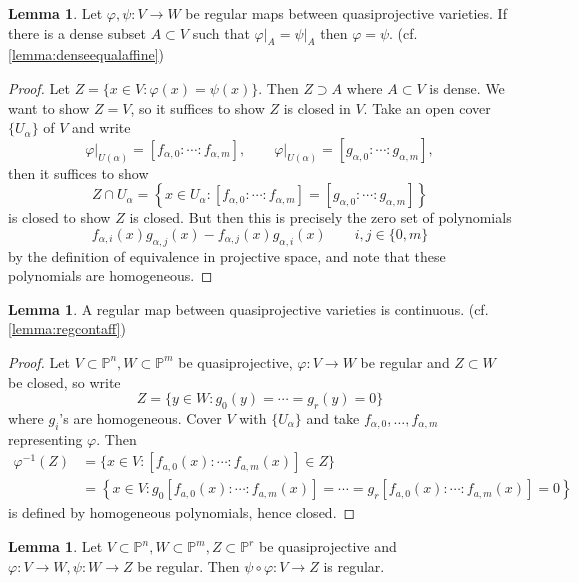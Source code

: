 \documentclass{article}
\newcommand{\p}{\mathbb{P}}
\theoremstyle{definition}
\newtheorem{lemma}[defn]{Lemma}
\begin{document}
\begin{lemma}
Let $\varphi,\psi:V\rightarrow W$ be regular maps between quasiprojective varieties. If there is a dense subset $A\subset V$ such that $\left.\varphi\right|_A=\left.\psi\right|_A$ then $\varphi=\psi$. (cf. \ref{lemma:denseequalaffine})
\end{lemma}
\begin{proof}
Let $Z=\{x\in V:\varphi(x)=\psi(x)\}$. Then $Z\supset A$ where $A\subset V$ is dense. We want to show $Z=V$, so it suffices to show $Z$ is closed in $V$. Take an open cover $\{U_\alpha\}$ of $V$ and write
\[
\left.\varphi\right|_{U(\alpha)}=\left[f_{\alpha,0}:\cdots:f_{\alpha,m}\right],\qquad \left.\varphi\right|_{U(\alpha)}=\left[g_{\alpha,0}:\cdots:g_{\alpha,m}\right],
\]
then it suffices to show
\[
Z\cap U_\alpha=\left\{x\in U_\alpha:\left[f_{\alpha,0}:\cdots:f_{\alpha,m}\right]=\left[g_{\alpha,0}:\cdots:g_{\alpha,m}\right]\right\}
\]
is closed to show $Z$ is closed. But then this is precisely the zero set of polynomials
\[
f_{\alpha,i}(x)g_{\alpha,j}(x)-f_{\alpha,j}(x)g_{\alpha,i}(x) \qquad i,j\in\{0,m\}
\]
by the definition of equivalence in projective space, and note that these polynomials are homogeneous.
\end{proof}

\begin{lemma}
A regular map between quasiprojective varieties is continuous. (cf. \ref{lemma:regcontaff})
\end{lemma}
\begin{proof}
Let $V\subset\p^n,W\subset\p^m$ be quasiprojective, $\varphi:V\rightarrow W$ be regular and $Z\subset W$ be closed, so write
\[
Z=\{y\in W:g_0(y)=\cdots=g_r(y)=0\}
\]
where $g_i$'s are homogeneous. Cover $V$ with $\{U_\alpha\}$ and take $f_{\alpha,0},\ldots,f_{\alpha,m}$ representing $\varphi$. Then
\[
\begin{aligned}
\varphi^{-1}(Z)&=\{x\in V:[f_{a,0}(x):\cdots:f_{a,m}(x)]\in Z\} \\
&=\left\{x\in V:g_0[f_{a,0}(x):\cdots:f_{a,m}(x)]=\cdots=g_r[f_{a,0}(x):\cdots:f_{a,m}(x)]=0\right\}
\end{aligned}
\]
is defined by homogeneous polynomials, hence closed.
\end{proof}

\begin{lemma}
Let $V\subset\p^n,W\subset\p^m,Z\subset\p^r$ be quasiprojective and $\varphi:V\rightarrow W,\psi:W\rightarrow Z$ be regular. Then $\psi\circ\varphi:V\rightarrow Z$ is regular.
\end{lemma}
\end{document}
